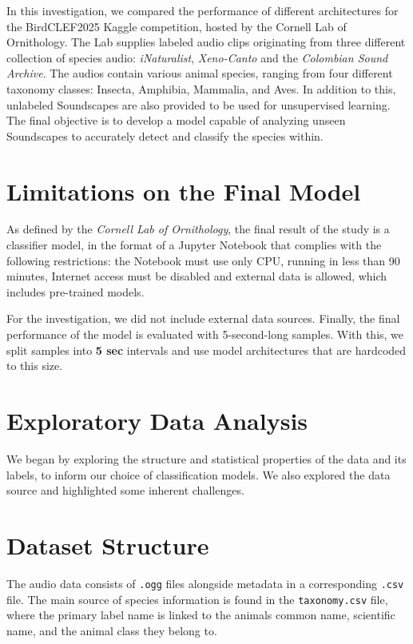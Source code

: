 \documentclass[10pt]{article}
\begin{document}
In this investigation, we compared the performance of different architectures for the BirdCLEF2025 Kaggle competition, hosted by the Cornell Lab of Ornithology. The Lab supplies labeled audio clips originating from three different collection of species audio: \textit{iNaturalist}, \textit{Xeno-Canto} and the \textit{Colombian Sound Archive}. The audios contain various animal species, ranging from four different taxonomy classes: Insecta, Amphibia, Mammalia, and Aves. In addition to this, unlabeled Soundscapes are also provided to be used for unsupervised learning. The final objective is to develop a model capable of analyzing unseen Soundscapes to accurately detect and classify the species within.

\section*{Limitations on the Final Model}

As defined by the \textit{Cornell Lab of Ornithology}, the final result of the study is a classifier model, in the format of a Jupyter Notebook that complies with the following restrictions: the Notebook must use only CPU, running in less than 90 minutes, Internet access must be disabled and external data is allowed, which includes pre-trained models.

For the investigation, we did not include external data sources. Finally, the final performance of the model is evaluated with 5-second-long samples. With this, we split samples into \textbf{5 sec} intervals and use model architectures that are hardcoded to this size.

\section*{Exploratory Data Analysis}

We began by exploring the structure and statistical properties of the data and its labels, to inform our choice of classification models. We also explored the data source and highlighted some inherent challenges.

\section*{Dataset Structure}

The audio data consists of \texttt{.ogg} files alongside metadata in a corresponding \texttt{.csv} file. The main source of species information is found in the \texttt{taxonomy.csv} file, where the primary label name is linked to the animals common name, scientific name, and the animal class they belong to.
\end{document}
